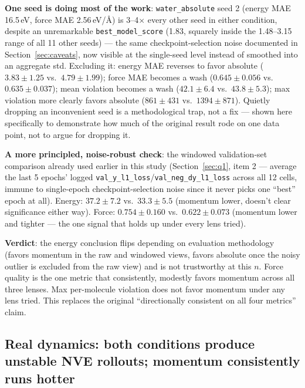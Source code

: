 \documentclass[11pt]{article}
\begin{document}
\textbf{One seed is doing most of the work}: \texttt{water\_absolute} seed 2
(energy MAE 16.5\,eV, force MAE 2.56\,eV/\AA) is 3--4$\times$ every other
seed in either condition, despite an unremarkable \texttt{best\_model\_score}
(1.83, squarely inside the 1.48--3.15 range of all 11 other seeds) --- the
same checkpoint-selection noise documented in Section~\ref{sec:caveats}, now
visible at the single-seed level instead of smoothed into an aggregate std.
Excluding it: energy MAE reverses to favor absolute ($3.83\pm1.25$ vs.\
$4.79\pm1.99$); force MAE becomes a wash ($0.645\pm0.056$ vs.\
$0.635\pm0.037$); mean violation becomes a wash ($42.1\pm6.4$ vs.\
$43.8\pm5.3$); max violation more clearly favors absolute
($861\pm431$ vs.\ $1394\pm871$). Quietly dropping an inconvenient seed is a
methodological trap, not a fix --- shown here specifically to demonstrate how
much of the original result rode on one data point, not to argue for
dropping it.

\textbf{A more principled, noise-robust check}: the windowed
validation-set comparison already used earlier in this study
(Section~\ref{sec:q1}, item 2 --- average the last 5 epochs' logged
\texttt{val\_y\_l1\_loss}/\texttt{val\_neg\_dy\_l1\_loss} across all 12
cells, immune to single-epoch checkpoint-selection noise since it never
picks one ``best'' epoch at all). Energy: $37.2\pm7.2$ vs.\ $33.3\pm5.5$
(momentum lower, doesn't clear significance either way). Force:
$0.754\pm0.160$ vs.\ $0.622\pm0.073$ (momentum lower and tighter --- the one
signal that holds up under every lens tried).

\textbf{Verdict}: the energy conclusion flips depending on evaluation
methodology (favors momentum in the raw and windowed views, favors absolute
once the noisy outlier is excluded from the raw view) and is not trustworthy
at this $n$. Force quality is the one metric that consistently, modestly
favors momentum across all three lenses. Max per-molecule violation does not
favor momentum under any lens tried. This replaces the original
``directionally consistent on all four metrics'' claim.

\subsection{Real dynamics: both conditions produce unstable NVE rollouts;
momentum consistently runs hotter}
\label{sec:rollout-results}
\end{document}
